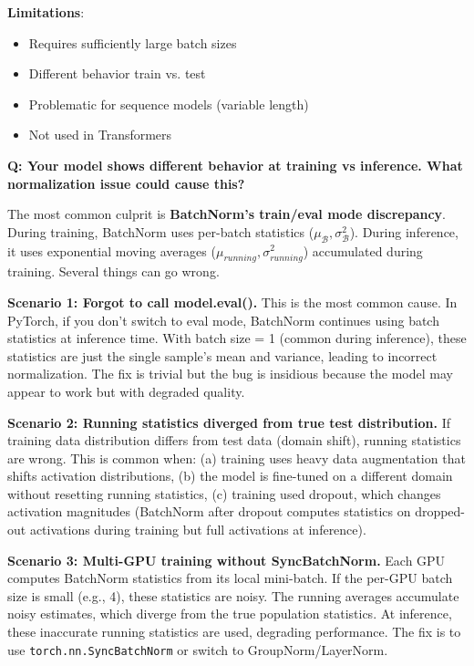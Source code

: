 \textbf{Limitations}:
\begin{itemize}
    \item Requires sufficiently large batch sizes
    \item Different behavior train vs. test
    \item Problematic for sequence models (variable length)
    \item Not used in Transformers
\end{itemize}


\begin{interviewq}
\textbf{Q: Your model shows different behavior at training vs inference. What normalization issue could cause this?}

 \quad {} \quad \badgefreq{\freqmed}

\stronganswer

The most common culprit is \textbf{BatchNorm's train/eval mode discrepancy}. During training, BatchNorm uses per-batch statistics ($\mu_\mathcal{B}, \sigma^2_\mathcal{B}$). During inference, it uses exponential moving averages ($\mu_{running}, \sigma^2_{running}$) accumulated during training. Several things can go wrong.

\textbf{Scenario 1: Forgot to call model.eval().} This is the most common cause. In PyTorch, if you don't switch to eval mode, BatchNorm continues using batch statistics at inference time. With batch size = 1 (common during inference), these statistics are just the single sample's mean and variance, leading to incorrect normalization. The fix is trivial but the bug is insidious because the model may appear to work but with degraded quality.

\textbf{Scenario 2: Running statistics diverged from true test distribution.} If training data distribution differs from test data (domain shift), running statistics are wrong. This is common when: (a) training uses heavy data augmentation that shifts activation distributions, (b) the model is fine-tuned on a different domain without resetting running statistics, (c) training used dropout, which changes activation magnitudes (BatchNorm after dropout computes statistics on dropped-out activations during training but full activations at inference).

\textbf{Scenario 3: Multi-GPU training without SyncBatchNorm.} Each GPU computes BatchNorm statistics from its local mini-batch. If the per-GPU batch size is small (e.g., 4), these statistics are noisy. The running averages accumulate noisy estimates, which diverge from the true population statistics. At inference, these inaccurate running statistics are used, degrading performance. The fix is to use \texttt{torch.nn.SyncBatchNorm} or switch to GroupNorm/LayerNorm.


\end{interviewq}
